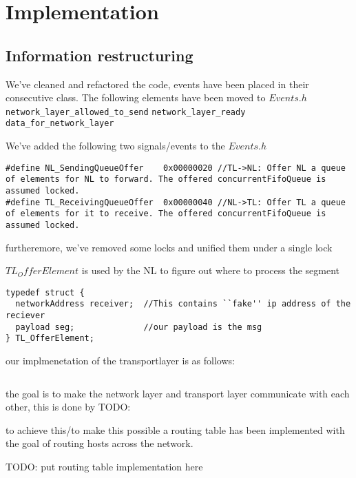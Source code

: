\section{Implementation}
\subsection{Information restructuring}

We've cleaned and refactored the code, events have been placed in their consecutive class.
The following elements have been moved to $Events.h$
\\
\texttt{network\_layer\_allowed\_to\_send}
\break
\texttt{network\_layer\_ready}
\break
\texttt{data\_for\_network\_layer}
\break

We've added the following two signals/events to the $Events.h$

\begin{lstlisting}
#define NL_SendingQueueOffer    0x00000020 //TL->NL: Offer NL a queue of elements for NL to forward. The offered concurrentFifoQueue is assumed locked.
#define TL_ReceivingQueueOffer  0x00000040 //NL->TL: Offer TL a queue of elements for it to receive. The offered concurrentFifoQueue is assumed locked.
\end{lstlisting}

furtheremore, we've removed some locks and unified them under a single lock



$TL_OfferElement$ is used by the NL to figure out where to process the segment

\begin{lstlisting}
typedef struct {
  networkAddress receiver;  //This contains ``fake'' ip address of the reciever
  payload seg;              //our payload is the msg
} TL_OfferElement;
\end{lstlisting}

our implmenetation of the transportlayer is as follows:

\begin{lstlisting}
\end{lstlisting}

the goal is to make the network layer and transport layer communicate with each other, this is done by TODO:


to achieve this/to make this possible a routing table has been implemented with the goal of routing hosts across the network.

TODO: put routing table implementation here

